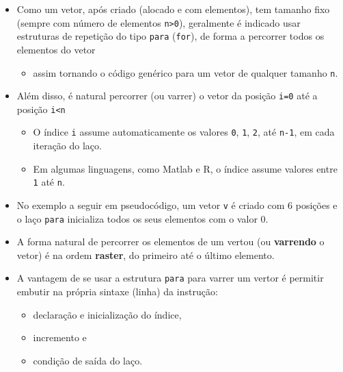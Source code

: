 \documentclass[12pt,a4paper]{article}
\providecommand{\tightlist}{%
      \setlength{\itemsep}{0pt}\setlength{\parskip}{0pt}}
\begin{document}
    \begin{itemize}
\tightlist
\item
  Como um vetor, após criado (alocado e com elementos), tem tamanho fixo
  (sempre com número de elementos \texttt{n\textgreater{}0}), geralmente
  é indicado usar estruturas de repetição do tipo \texttt{para}
  (\texttt{for}), de forma a percorrer todos os elementos do vetor

  \begin{itemize}
  \tightlist
  \item
    assim tornando o código genérico para um vetor de qualquer tamanho
    \texttt{n}.
  \end{itemize}
\item
  Além disso, é natural percorrer (ou varrer) o vetor da posição
  \texttt{i=0} até a posição \texttt{i\textless{}n}

  \begin{itemize}
  \tightlist
  \item
    O índice \texttt{i} assume automaticamente os valores \texttt{0},
    \texttt{1}, \texttt{2}, até \texttt{n-1}, em cada iteração do
    laço.\\
  \item
    Em algumas linguagens, como Matlab e R, o índice assume valores
    entre \texttt{1} até \texttt{n}.
  \end{itemize}
\end{itemize}

    \begin{itemize}
\tightlist
\item
  No exemplo a seguir em pseudocódigo, um vetor \texttt{v} é criado com
  6 posições e o laço \texttt{para} inicializa todos os seus elementos
  com o valor 0.
\item
  A forma natural de percorrer os elementos de um vertou (ou
  \textbf{varrendo} o vetor) é na ordem \textbf{raster}, do primeiro até
  o último elemento.
\item
  A vantagem de se usar a estrutura \texttt{para} para varrer um vertor
  é permitir embutir na própria sintaxe (linha) da instrução:

  \begin{itemize}
  \tightlist
  \item
    declaração e inicialização do índice,
  \item
    incremento e
  \item
    condição de saída do laço.
  \end{itemize}
\end{itemize}
\end{document}
